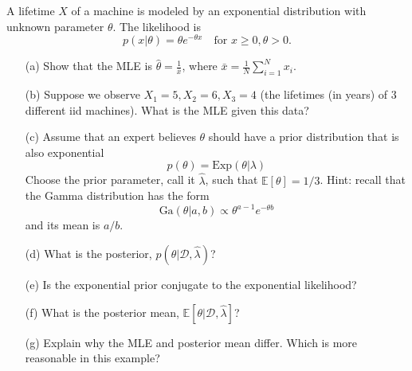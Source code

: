 \documentclass{chaistyle}
\begin{document}
\begin{example*}
    A lifetime \( X \) of a machine is modeled by an exponential distribution with unknown parameter \( \theta \). The likelihood is \[p(x|\theta) = \theta e^{-\theta x} \quad \text{for } x \geq 0, \theta > 0.\]
    \begin{enumerate}
        \item[(a)] Show that the MLE is \( \hat{\theta} = \frac{1}{\bar{x}} \), where \( \bar{x} = \frac{1}{N} \sum_{i=1}^{N} x_i \).
        \item[(b)] Suppose we observe \( X_1 = 5, X_2 = 6, X_3 = 4 \) (the lifetimes (in years) of 3 different iid machines). What is the MLE given this data?
        \item[(c)] Assume that an expert believes \( \theta \) should have a prior distribution that is also exponential \[p(\theta) = \text{Exp}(\theta | \lambda)\] Choose the prior parameter, call it \( \hat{\lambda} \), such that \( \mathbb{E}[\theta] = 1/3 \). Hint: recall that the Gamma distribution has the form \[\text{Ga}(\theta | a, b) \propto \theta^{a-1} e^{-\theta b}\] and its mean is \( a/b \).
        \item[(d)] What is the posterior, \( p(\theta | \mathcal{D}, \hat{\lambda}) \)?
        \item[(e)] Is the exponential prior conjugate to the exponential likelihood?
        \item[(f)] What is the posterior mean, \( \mathbb{E} \left[ \theta | \mathcal{D}, \hat{\lambda} \right] \)?
        \item[(g)] Explain why the MLE and posterior mean differ. Which is more reasonable in this example?
    \end{enumerate}
\end{example*}
\end{document}
